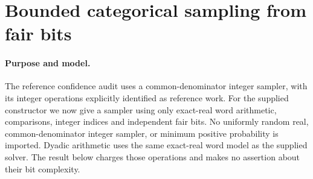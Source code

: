 \section[Sampling with fair bits]{Bounded categorical sampling from fair bits}
\label{sec:op3-fair-bit-sampling}

\paragraph{Purpose and model.}
The reference confidence audit uses a common-denominator integer sampler,
with its integer operations explicitly identified as reference work.
For the supplied constructor we now give a sampler using only exact-real
word arithmetic, comparisons, integer indices and independent fair bits.
No uniformly random real, common-denominator integer sampler, or minimum
positive probability is imported. Dyadic arithmetic uses the same
exact-real word model as the supplied solver. The result below charges
those operations and makes no assertion about their bit complexity.

